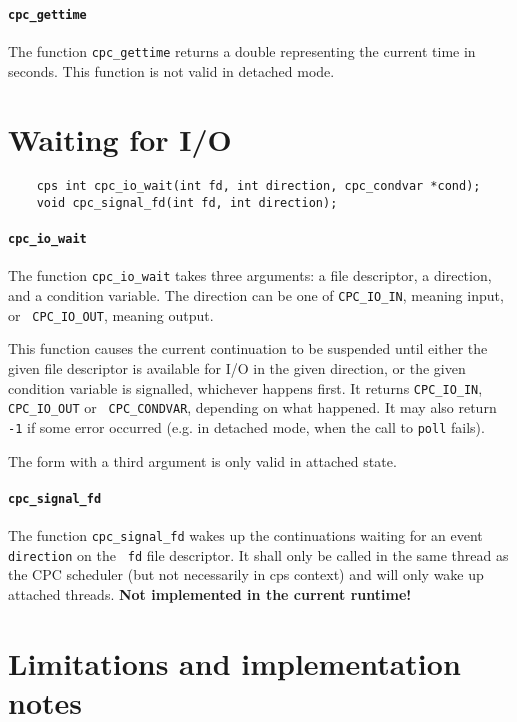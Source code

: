 \documentclass[a4paper]{report}
\begin{document}
\paragraph{\tt cpc\_gettime} The function {\tt cpc\_gettime} returns a double
representing the current time in seconds.  This function is not valid in
detached mode.

\section{Waiting for I/O}

\begin{verbatim}
    cps int cpc_io_wait(int fd, int direction, cpc_condvar *cond);
    void cpc_signal_fd(int fd, int direction);
\end{verbatim}

\paragraph{\tt cpc\_io\_wait} The function {\tt cpc\_io\_wait} takes three
arguments: a file descriptor, a direction, and a condition variable.
The direction can be one of {\tt CPC\_IO\_IN}, meaning input, or {\tt
  CPC\_IO\_OUT}, meaning output.

This function causes the current continuation to be suspended until
either the given file descriptor is available for I/O in the given
direction, or the given condition variable is signalled, whichever
happens first.  It returns {\tt CPC\_IO\_IN}, {\tt CPC\_IO\_OUT} or {\tt
CPC\_CONDVAR}, depending on what happened.  It may also return {\tt -1}
if some error occurred (e.g. in detached mode, when the call to
{\tt poll} fails).

The form with a third argument is only valid in attached state.

\paragraph{\tt cpc\_signal\_fd} The function {\tt cpc\_signal\_fd} wakes
up the continuations waiting for an event {\tt direction} on the {\tt
fd} file descriptor.  It shall only be called in the same thread as the
CPC scheduler (but not necessarily in cps context) and will only wake up
attached threads. {\bf Not implemented in the current runtime!}

\section{Limitations and implementation notes}
\end{document}
